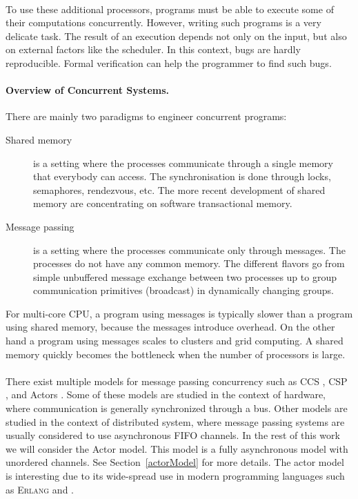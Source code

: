 \documentclass[a4paper]{report}
\numberwithin{algorithm}{chapter}
\begin{document}
\paragraph{}
To use these additional processors, programs must be able to execute some of their computations concurrently.
However, writing such programs is a very delicate task.
The result of an execution depends not only on the input, but also on external factors like the scheduler.
In this context, bugs are hardly reproducible.
Formal verification can help the programmer to find such bugs.

\paragraph{Overview of Concurrent Systems.}
There are mainly two paradigms to engineer concurrent programs:

\begin{description}

\item[Shared memory] is a setting where the processes communicate through a single memory that everybody can access.
The synchronisation is done through locks, semaphores, rendezvous, etc.
The more recent development of shared memory are concentrating on software transactional memory.

\item[Message passing] is a setting where the processes communicate only through messages.
The processes do not have any common memory.
The different flavors go from simple unbuffered message exchange between two processes up to group communication primitives (broadcast) in dynamically changing groups.
\end{description}

For multi-core CPU, a program using messages is typically slower than a program using shared memory, because the messages introduce overhead.
On the other hand a program using messages scales to clusters and grid computing.
A shared memory quickly becomes the bottleneck when the number of processors is large.

\paragraph{}
There exist multiple models for message passing concurrency such as
    CCS \cite{DBLP:books/sp/Milner80},
    CSP \cite{DBLP:journals/cacm/Hoare78},
    and Actors \cite{DBLP:conf/ijcai/HewittBS73}.
Some of these models are studied in the context of hardware, where communication is generally synchronized through a bus.
Other models are studied in the context of distributed system, where message passing systems are usually considered to use asynchronous FIFO channels.
In the rest of this work we will consider the Actor model.
This model is a fully asynchronous model with unordered channels.
See Section~\ref{actorModel} for more details.
The actor model is interesting due to its wide-spread use in modern programming languages such as \textsc{Erlang}\cite{DBLP:conf/hopl/Armstrong07} and \scala{}\cite{DBLP:conf/aplas/Odersky04}.
\end{document}
